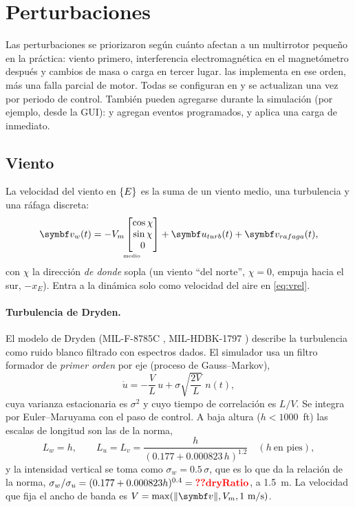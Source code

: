\section{Perturbaciones}
\label{sec:perturbaciones}

Las perturbaciones se priorizaron según cuánto afectan a un multirrotor
pequeño en la práctica: viento primero, interferencia electromagnética en el
magnetómetro después y cambios de masa o carga en tercer lugar.
 las implementa en ese orden,
más una falla parcial de motor. Todas se configuran en
 y se actualizan una vez por periodo de control.
También pueden agregarse durante la simulación (por ejemplo, desde la GUI):
 y  agregan
eventos programados, y  aplica una carga de
inmediato.

\subsection{Viento}

La velocidad del viento en $\{E\}$ es la suma de un viento medio, una
turbulencia y una ráfaga discreta:
\begin{equation}
\vect v_w(t)=\underset{\scriptscriptstyle \text{medio}}{-V_m\begin{bmatrix}\cos\chi\\ \sin\chi\\ 0\end{bmatrix}}
+\vect u_{turb}(t)+\vect v_{rafaga}(t),
\label{eq:viento}
\end{equation}
con $\chi$ la dirección \emph{de donde} sopla (un viento ``del norte'',
$\chi=0$, empuja hacia el sur, $-x_E$). Entra a la dinámica solo como
velocidad del aire en \eqref{eq:vrel}.

\paragraph{Turbulencia de Dryden.} El modelo de Dryden (MIL-F-8785C
\cite{mil8785}, MIL-HDBK-1797 \cite{milhdbk1797}) describe la turbulencia
como ruido blanco filtrado con espectros dados. El simulador usa un filtro
formador de \emph{primer orden} por eje (proceso de Gauss--Markov),
\begin{equation}
\dot u=-\frac{V}{L}\,u+\sigma\sqrt{\frac{2V}{L}}\;n(t),
\label{eq:dryden}
\end{equation}
cuya varianza estacionaria es $\sigma^2$ y cuyo tiempo de correlación es
$L/V$. Se integra por Euler--Maruyama con el paso de control. A baja altura
($h<1000$~ft) las escalas de longitud son las de la norma,
\begin{equation}
L_w=h,\qquad L_u=L_v=\frac{h}{(0.177+0.000823\,h)^{1.2}}\quad(h\ \text{en pies}),
\end{equation}
y la intensidad vertical se toma como $\sigma_w=0.5\,\sigma$, que es lo que
da la relación de la norma, $\sigma_w/\sigma_u=(0.177+0.000823h)^{0.4}=\val{dryRatio}$,
a 1.5~m. La velocidad que fija el ancho de banda es
$V=\max(\|\vect v\|,V_m,1~\text{m/s})$.

